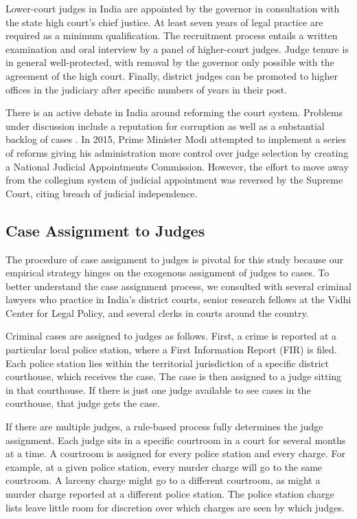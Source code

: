 \documentclass[12pt,english]{article}
\begin{document}
Lower-court judges in India are appointed by the governor in consultation with the state high court's chief justice. At least seven years of legal practice are required as a  minimum qualification. The recruitment process entails a written examination and oral interview by a panel of higher-court judges. Judge tenure is in general well-protected, with removal by the governor only possible with the agreement of the high court. Finally,  district judges can be promoted to higher offices in the judiciary after specific numbers of years in their post.

There is an active debate in India around reforming the court system. Problems under discussion include a reputation for corruption \citep{AtulDev_2019} as well as a substantial backlog of cases \citep{trusts2019india}. In 2015, Prime Minister Modi attempted to implement a series of reforms giving his administration more control over judge selection by creating a National Judicial Appointments Commission. However, the effort to move away from the collegium system of judicial appointment was reversed by the Supreme Court, citing breach of judicial independence. 

\subsection{Case Assignment to Judges}

The procedure of case assignment to judges is pivotal for this study because our empirical strategy hinges on the exogenous assignment of judges to cases. To better understand the case assignment process, we consulted with several criminal lawyers who practice in India's district courts, senior research fellows at the Vidhi Center for Legal Policy, and several clerks in courts around the country. 

Criminal cases are assigned to judges as follows. First, a crime is reported at a particular local  police station, where a First Information Report (FIR) is filed. Each police station lies within the territorial jurisdiction of a specific district courthouse, which receives the case. The case is then assigned to a judge sitting in that courthouse. If there is just one judge available to see cases in the courthouse, that judge gets the case.

If there are multiple judges, a rule-based process fully determines the judge assignment. Each judge sits in a specific courtroom in a court for several months at a time. A courtroom is assigned for every police station and every charge. For example, at a given police station, every murder charge will go to the same courtroom. A larceny charge might go to a different courtroom, as might a murder charge reported at a different police station. The police station charge lists leave little room for discretion over which charges are seen by which judges. 
\end{document}
